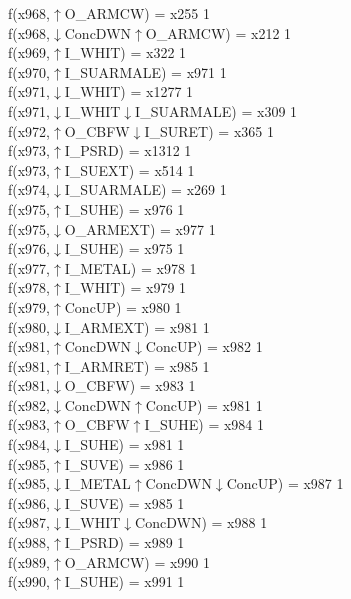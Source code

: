 f(x968,$\uparrow$O\_ARMCW) = x255 {1} \\
f(x968,$\downarrow$ConcDWN$\uparrow$O\_ARMCW) = x212 {1} \\
f(x969,$\uparrow$I\_WHIT) = x322 {1} \\
f(x970,$\uparrow$I\_SUARMALE) = x971 {1} \\
f(x971,$\downarrow$I\_WHIT) = x1277 {1} \\
f(x971,$\downarrow$I\_WHIT$\downarrow$I\_SUARMALE) = x309 {1} \\
f(x972,$\uparrow$O\_CBFW$\downarrow$I\_SURET) = x365 {1} \\
f(x973,$\uparrow$I\_PSRD) = x1312 {1} \\
f(x973,$\uparrow$I\_SUEXT) = x514 {1} \\
f(x974,$\downarrow$I\_SUARMALE) = x269 {1} \\
f(x975,$\uparrow$I\_SUHE) = x976 {1} \\
f(x975,$\downarrow$O\_ARMEXT) = x977 {1} \\
f(x976,$\downarrow$I\_SUHE) = x975 {1} \\
f(x977,$\uparrow$I\_METAL) = x978 {1} \\
f(x978,$\uparrow$I\_WHIT) = x979 {1} \\
f(x979,$\uparrow$ConcUP) = x980 {1} \\
f(x980,$\downarrow$I\_ARMEXT) = x981 {1} \\
f(x981,$\uparrow$ConcDWN$\downarrow$ConcUP) = x982 {1} \\
f(x981,$\uparrow$I\_ARMRET) = x985 {1} \\
f(x981,$\downarrow$O\_CBFW) = x983 {1} \\
f(x982,$\downarrow$ConcDWN$\uparrow$ConcUP) = x981 {1} \\
f(x983,$\uparrow$O\_CBFW$\uparrow$I\_SUHE) = x984 {1} \\
f(x984,$\downarrow$I\_SUHE) = x981 {1} \\
f(x985,$\uparrow$I\_SUVE) = x986 {1} \\
f(x985,$\downarrow$I\_METAL$\uparrow$ConcDWN$\downarrow$ConcUP) = x987 {1} \\
f(x986,$\downarrow$I\_SUVE) = x985 {1} \\
f(x987,$\downarrow$I\_WHIT$\downarrow$ConcDWN) = x988 {1} \\
f(x988,$\uparrow$I\_PSRD) = x989 {1} \\
f(x989,$\uparrow$O\_ARMCW) = x990 {1} \\
f(x990,$\uparrow$I\_SUHE) = x991 {1} \\
